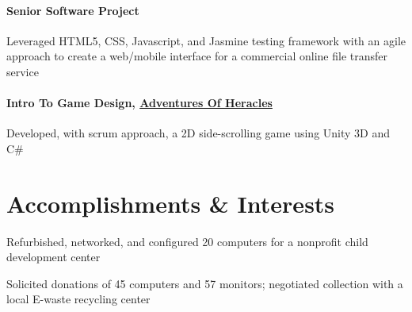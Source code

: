 \documentclass[letterpaper]{deedy-resume} %
\begin{document}
\begin{minipage}[t]{0.73\textwidth}
\paragraph{Senior Software Project}
\begin{tightitemize}
\item Leveraged HTML5, CSS, Javascript, and Jasmine testing framework with an agile approach to create a web/mobile interface for a commercial online file transfer service
\end{tightitemize}
\paragraph{Intro To Game Design, \href{https://github.com/TrinityUniversityGameDesign/Heracles}{\bfseries Adventures Of Heracles}}
\begin{tightitemize}
\item Developed, with scrum approach, a 2D side-scrolling game using Unity 3D and C\#
\end{tightitemize} 
\sectionspace %



\end{minipage}
\vspace{5 mm}
\section{Accomplishments \& Interests}


\begin{tightitemize}
\item Refurbished, networked, and configured 20 computers for a nonprofit child development center 
\item Solicited donations of 45 computers and 57 monitors; negotiated collection with a local E-waste recycling center
\end{tightitemize}
\end{document}
